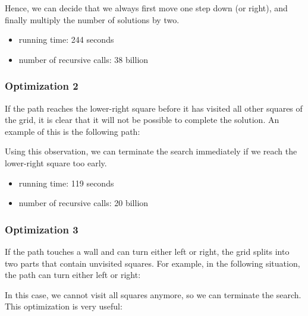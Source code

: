 Hence, we can decide that we always first
move one step down (or right),
and finally multiply the number of solutions by two.

\begin{itemize}
\item
running time: 244 seconds
\item
number of recursive calls: 38 billion
\end{itemize}

\subsubsection{Optimization 2}

If the path reaches the lower-right square
before it has visited all other squares of the grid,
it is clear that
it will not be possible to complete the solution.
An example of this is the following path:

\begin{center}
\end{center}
Using this observation, we can terminate the search
immediately if we reach the lower-right square too early.
\begin{itemize}
\item
running time: 119 seconds
\item
number of recursive calls: 20 billion
\end{itemize}

\subsubsection{Optimization 3}

If the path touches a wall
and can turn either left or right,
the grid splits into two parts
that contain unvisited squares.
For example, in the following situation,
the path can turn either left or right:

\begin{center}
\end{center}
In this case, we cannot visit all squares anymore,
so we can terminate the search.
This optimization is very useful:

